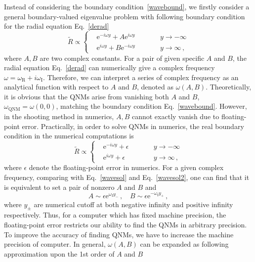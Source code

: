 \documentclass[pr, twocolumn, preprintnumbers, showpacs,footnoteadded, superscriptaddress,nofootinbib,longbibliography]{revtex4-1}
\newcommand{\te}{\mathrm{e}}
\begin{document}
Instead of considering the boundary condition~\eqref{wavebound}, we firstly consider a general boundary-valued eigenvalue problem with following boundary condition for the radial equation Eq.~\eqref{derad}
%
\begin{equation}\label{wavesol}
\tilde{R} \varpropto \left\{
\begin{aligned}
&\te^{-i \omega y } + A \te^{i \omega y} \quad \quad  &&y \to -\infty \\
&\te^{i \omega y} + B \te^{-i \omega y}  \quad \quad  &&y \to \infty \, ,
\end{aligned}
\right.
\end{equation}
%
where $A, B$ are two complex constants. For a pair of given specific $A$ and $B$, the radial equation Eq.~\eqref{derad} can numerically give a complex frequency $\omega=\omega_{\text{R}}+i \omega_{\text{I}}$. Therefore, we can interpret a series of complex frequency as an analytical function with respect to $A$ and $B$, denoted as $\omega(A, B)$. Theoretically, it is obvious that the QNMs arise from vanishing both $A$ and $B$, $\omega_{\text{QNM}}=\omega(0,0)$, matching the boundary condition Eq.~\eqref{wavebound}. However, in the shooting method in numerics, $A, B$ cannot exactly vanish due to floating-point error. Practically, in order to solve QNMs in numerics, the real boundary condition in the numerical computations is
%
\begin{equation}\label{wavesol2}
\tilde{R} \varpropto \left\{
\begin{aligned}
&\te^{-i \omega y } + \epsilon \quad \quad  &&y \to -\infty \\
&\te^{i \omega y} + \epsilon \quad \quad  &&y \to \infty \, ,
\end{aligned}
\right.
\end{equation}
%
where $\epsilon$ denote the floating-point error in numerics. For a given complex frequency, comparing with Eq.~\eqref{wavesol} and Eq.~\eqref{wavesol2}, one can find that it is equivalent to set a pair of nonzero $A$ and $B$ and
%
%
%
\begin{equation} \label{Aep}
A \sim \epsilon \te^{\omega_{\text{I}}y_{-}} \, ,\quad B \sim \epsilon \te^{-\omega_{\text{I}} y_{+}} \, ,
\end{equation}
%
where $y_{\pm }$ are numerical cutoff at both negative infinity and positive infinity respectively. Thus, for a computer which has fixed machine precision, the floating-point error restricts our ability to find the QNMs in arbitrary precision. To improve the accuracy of finding QNMs, we have to increase the machine precision of computer. In general, $\omega(A, B)$ can be expanded as following approximation upon the 1st order of $A$ and $B$
\end{document}
